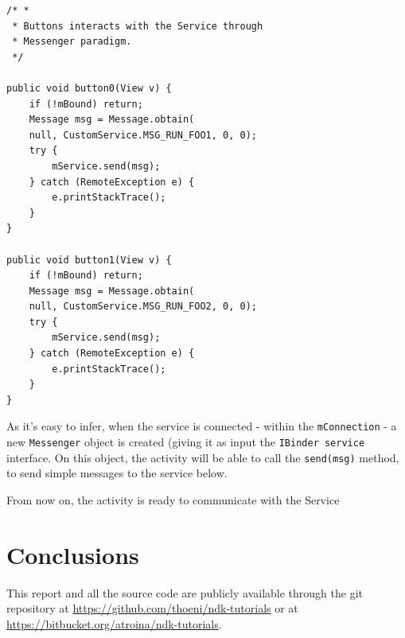 \documentclass[a4paper,10pt]{article}
\newcommand{\keyword}[1]{\texttt{#1}}
\begin{document}
\begin{multicols}{2}
\begin{lstlisting}
/* *
 * Buttons interacts with the Service through
 * Messenger paradigm.
 */

public void button0(View v) {
	if (!mBound) return;
	Message msg = Message.obtain(
	null, CustomService.MSG_RUN_FOO1, 0, 0);
	try {
		mService.send(msg);
	} catch (RemoteException e) {
		e.printStackTrace();
	}
}

public void button1(View v) {
	if (!mBound) return;
	Message msg = Message.obtain(
	null, CustomService.MSG_RUN_FOO2, 0, 0);
	try {
		mService.send(msg);
	} catch (RemoteException e) {
		e.printStackTrace();
	}
}
\end{lstlisting}

As it's easy to infer, when the service is connected - within the
\keyword{mConnection} - a new \keyword{Messenger} object is created (giving it
as input the \keyword{IBinder service} interface. On this object, the activity
will be able to call the \keyword{send(msg)} method, to send simple messages to
the service below.

From now on, the activity is ready to communicate with the Service


\section{Conclusions}

This report and all the source code are publicly available through the git
repository at \url{https://github.com/thoeni/ndk-tutorials} or at
\url{https://bitbucket.org/atroina/ndk-tutorials}.

\nocite{liang1999jni}
\nocite{marakanajni}
\nocite{learningandroid}
\nocite{programmingandroid}




\end{multicols}
\end{document}
